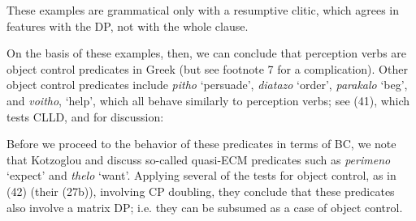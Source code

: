 \documentclass[output=paper]{langsci/langscibook}
\begin{document}
\ea%
    \label{ex:alexiadou:40}
    \z
\z  

These examples are grammatical only with a resumptive clitic, which agrees in features with the DP, not with the whole clause.{} 

On the basis of these examples, then, we can conclude that perception verbs are object control predicates in Greek (but see footnote 7 for a complication). Other object control predicates include \textit{pitho} ‘persuade’, \textit{diatazo} ‘order’, \textit{parakalo} ‘beg’, and \textit{voitho}, ‘help’, which all behave similarly to perception verbs; see (41), which tests CLLD, and \citet{Kotzoglou2002} for discussion:

    \z

Before we proceed to the behavior of these predicates in terms of BC, we note that Kotzoglou and \citet{Papangeli2007} discuss so-called quasi-ECM predicates such as \textit{perimeno} ‘expect’ and \textit{thelo} ‘want’. Applying several of the tests for object control, as in (42) (their (27b)), involving CP doubling, they conclude that these predicates also involve a matrix DP; i.e. they can be subsumed as a case of object control. 
\end{document}
